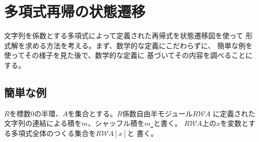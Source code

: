 \begingroup %
	\newcommand{\Tree}{\ensuremath{\mathcal{T}}}
	\newcommand{\treeu}{\ensuremath{1_\Tree}}
	\newcommand{\Forget}{\ensuremath{\mathcal{U}}}
	\newcommand{\Word}{\ensuremath{\mathcal{W}}}
	\newcommand{\wordu}{\ensuremath{1_{\Word}}}
	\newcommand{\word}[1]{\ensuremath{[{#1}]}}
	\newcommand{\push}{\ensuremath{\myop{push}}}
	\newcommand{\pop}{\ensuremath{\myop{pop}}}
	\newcommand{\Nothing}{\ensuremath{\myop{None}}}
	\newcommand{\none}{\ensuremath{\myop{none}}}
	\newcommand{\Maybe}{\ensuremath{\myop{Maybe}}}
	\newcommand{\onto}{\ensuremath{\myop{onto}}}
	\newcommand{\lin}{\ensuremath{\myop{lin}}}
	\newcommand{\map}{\ensuremath{\myop{map}}}
	\newcommand{\defeq}{\ensuremath{\overset{\mathrm{def}}{=}}}
\section{多項式再帰の状態遷移}\label{s1:多項式再帰の状態遷移} %
	文字列を係数とする多項式によって定義された再帰式を状態遷移図を使って
	形式解を求める方法を考える。まず、数学的な定義にこだわらずに、
	簡単な例を使ってその様子を見た後で、数学的な定義に
	基づいてその内容を調べることにする。

\subsection{簡単な例}\label{s2:簡単な例} %
	$R$を標数$0$の半環、$A$を集合とする。$R$係数自由半モジュール$R\Word A$
	に定義された文字列の連結による積を$m$、シャッフル積を$m_\shuffle$と書く。
	$R\Word A$上の$x$を変数とする多項式全体のつくる集合を$R\Word A[x]$と
	書く。
	
